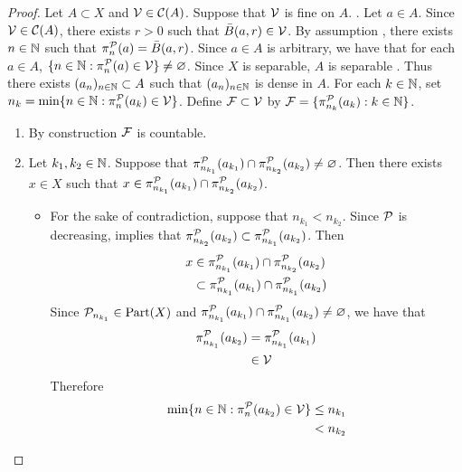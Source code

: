 \documentclass{book}
\begin{document}
	\begin{proof}
		Let $A \subset X$ and $\mathcal{V} \in \mathcal{C}(A)$. Suppose that $\mathcal{V}$ is fine on $A$. 
		.
		Let $a \in A$. Since $\mathcal{V} \in \mathcal{C}(A)$, there exists $r > 0$ such that $\bar{B}(a, r) \in \mathcal{V}$. By assumption , there exists $n \in \mathbb{N}$ such that $\pi^{\mathcal{P}}_n(a) = \bar{B}(a, r)$. Since $a \in A$ is arbitrary, we have that for each $a \in A$, $\{n \in \mathbb{N}: \pi^{\mathcal{P}}_n(a) \in \mathcal{V} \} \neq \varnothing$. Since $X$ is separable, $A$ is separable . Thus there exists $(a_n)_{n \in \mathbb{N}} \subset A$ such that $(a_n)_{n \in \mathbb{N}}$ is dense in $A$. For each $k \in \mathbb{N}$, set $n_k = \min \{n \in \mathbb{N}: \pi^{\mathcal{P}}_n(a_k) \in \mathcal{V} \}$. Define $\mathcal{F} \subset \mathcal{V}$ by $\mathcal{F} = \{\pi^{\mathcal{P}}_{n_k}(a_k): k \in \mathbb{N}\}$. 
		\begin{enumerate}
			\item By construction $\mathcal{F}$ is countable.
			\item Let $k_1, k_2 \in \mathbb{N}$. Suppose that $\pi^{\mathcal{P}}_{n_{k_1}}(a_{k_1}) \cap \pi^{\mathcal{P}}_{n_{k_2}}(a_{k_2}) \neq \varnothing$. Then there exists $x \in X$ such that $x \in \pi^{\mathcal{P}}_{n_{k_1}}(a_{k_1}) \cap \pi^{\mathcal{P}}_{n_{k_2}}(a_{k_2})$. 
			\begin{itemize}
				\item For the sake of contradiction, suppose that $n_{k_1} < n_{k_2}$. Since $\mathcal{P}$ is decreasing,  implies that $\pi^{\mathcal{P}}_{n_{k_2}}(a_{k_2}) \subset \pi^{\mathcal{P}}_{n_{k_1}}(a_{k_2})$. Then
				\begin{align*}
					x
					& \in \pi^{\mathcal{P}}_{n_{k_1}}(a_{k_1}) \cap \pi^{\mathcal{P}}_{n_{k_2}}(a_{k_2}) \\
					& \subset \pi^{\mathcal{P}}_{n_{k_1}}(a_{k_1}) \cap \pi^{\mathcal{P}}_{n_{k_1}}(a_{k_2}) 
				\end{align*}
				Since $\mathcal{P}_{n_{k_1}} \in \operatorname*{\text{Part}}(X)$ and $\pi^{\mathcal{P}}_{n_{k_1}}(a_{k_1}) \cap \pi^{\mathcal{P}}_{n_{k_1}}(a_{k_2}) \neq \varnothing$, we have that 
				\begin{align*}
					\pi^{\mathcal{P}}_{n_{k_1}}(a_{k_2})
					& = \pi^{\mathcal{P}}_{n_{k_1}}(a_{k_1}) \\
					& \in \mathcal{V}
				\end{align*}
				Therefore
				\begin{align*}
					\min \{n \in \N: \pi^{\MP}_n(a_{k_2}) \in \MV\}
					& \leq n_{k_1} \\
					& < n_{k_2} \\

\end{align*}
\end{itemize}
\end{enumerate}
\end{proof}
\end{document}
